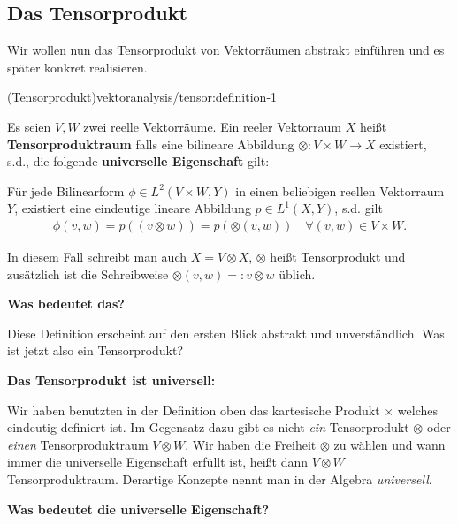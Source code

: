 \subsection{Das Tensorprodukt}
\label{\detokenize{vektoranalysis/tensor:das-tensorprodukt}}
\par
Wir wollen nun das Tensorprodukt von Vektorräumen abstrakt einführen und es später konkret realisieren.
\begin{definition}{(Tensorprodukt)}{vektoranalysis/tensor:definition-1}



\par
Es seien \(V,W\) zwei reelle Vektorräume. Ein reeler Vektorraum \(X\) heißt \textbf{Tensorproduktraum} falls eine bilineare Abbildung \(\otimes:V\times W\rightarrow X\) existiert, s.d., die folgende \textbf{universelle Eigenschaft} gilt:

\par
Für jede Bilinearform \(\phi\in L^2(V\times W, Y)\) in einen beliebigen reellen Vektorraum \(Y\), existiert eine eindeutige lineare Abbildung
\(p \in L^1(X, Y)\), s.d. gilt
\begin{align*}
\phi(v,w) = p((v\otimes w)) = p(\otimes(v,w))\quad\forall (v,w)\in V\times W.
\end{align*}
\par
In diesem Fall schreibt man auch \(X = V\otimes X\), \(\otimes\) heißt Tensorprodukt und zusätzlich ist die Schreibweise \(\otimes(v,w)=:v\otimes w\) üblich.
\end{definition}

\par
\textbf{Was bedeutet das?}

\par
Diese Definition erscheint auf den ersten Blick abstrakt und unverständlich. Was ist jetzt also ein Tensorprodukt?

\par
\textbf{Das Tensorprodukt ist universell:}

\par
Wir haben benutzten in der Definition oben das kartesische Produkt \(\times\) welches eindeutig definiert ist. Im Gegensatz dazu gibt es nicht \emph{ein} Tensorprodukt \(\otimes\) oder \emph{einen} Tensorproduktraum \(V\otimes W\). Wir haben die Freiheit \(\otimes\) zu wählen und wann immer die universelle Eigenschaft erfüllt ist, heißt dann \(V\otimes W\) Tensorproduktraum. Derartige Konzepte nennt man in der Algebra \emph{universell}.

\par
\textbf{Was bedeutet die universelle Eigenschaft?}

